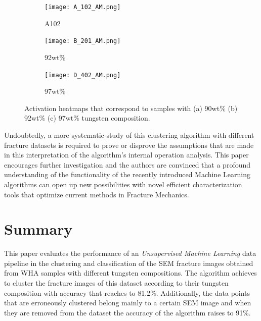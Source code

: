 \documentclass[authoryear,preprint,review,12pt, singleside]{elsarticle}
\begin{document}
\begin{figure}[!h]
	\centering
	\begin{subfigure}[b]{0.45\textwidth}
		\centering
		\texttt{[image: A\_102\_AM.png]}
		\caption{A102}
	\end{subfigure}
	\begin{subfigure}[b]{0.45\textwidth}
		\centering
		\texttt{[image: B\_201\_AM.png]}
		\caption{92wt\%}
	\end{subfigure}
	\begin{subfigure}[b]{0.45\textwidth}
		\centering
		\texttt{[image: D\_402\_AM.png]}
		\caption{97wt\% }
	\end{subfigure}
	\caption{Activation heatmaps that correspond to samples with (a) 90wt\% (b) 92wt\% (c) 97wt\% tungsten composition.}
	\label{fig:ABD_activ}
\end{figure}


Undoubtedly, a more systematic study of this clustering algorithm with different fracture datasets is required to prove or disprove the assumptions that are made in this interpretation of the algorithm's internal operation analysis. This paper encourages further investigation and the authors are convinced that a profound understanding of the functionality of the recently introduced Machine Learning algorithms can open up new possibilities with novel efficient characterization tools that optimize current methods in Fracture Mechanics.          
  
  

\section*{Summary}
\label{conclusions_label}

This paper evaluates the performance of an \textit{Unsupervised Machine Learning} data pipeline in the clustering and classification of the SEM fracture images obtained from WHA samples with different tungsten compositions. The algorithm achieves to cluster the fracture images of this dataset according to their tungsten composition with accuracy that reaches to 81.2\%. Additionally, the data points that are erroneously clustered belong mainly to a certain SEM image and when they are removed from the dataset the accuracy of the algorithm raises to 91\%. 
\end{document}
